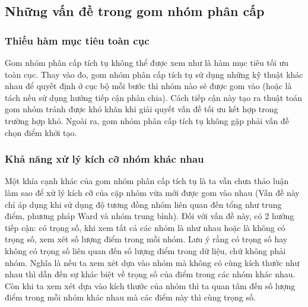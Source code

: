 
\subsection{Những vấn đề trong gom nhóm phân cấp}
\subsubsection{Thiếu hàm mục tiêu toàn cục}
Gom nhóm phân cấp tích tụ không thể được xem như là hàm mục tiêu tối ưu toàn cục.
Thay vào đo, gom nhóm phân cấp tích tụ sử dụng những kỹ thuật khác nhau để quyết định ở cục bộ mỗi bước thì nhóm nào sẽ được gom vào (hoặc là tách nếu sử dụng hướng tiếp cận phân chia).
Cách tiếp cận này tạo ra thuật toán gom nhóm tránh được khó khăn khi giải quyết vấn đề tối ưu kết hợp trong trường hợp khó.
Ngoài ra, gom nhóm phân cấp tích tụ không gặp phải vấn đề chọn điểm khởi tạo.

\subsubsection{Khả năng xử lý kích cỡ nhóm khác nhau}
Một khía cạnh khác của gom nhóm phân cấp tích tụ là ta vẫn chưa thảo luận làm sao để xử lý kích cỡ của cặp nhóm vừa mới được gom vào nhau (Vấn đề này chỉ áp dụng khi sử dụng độ tương đồng nhóm liên quan đến tổng như trung điểm, phương pháp Ward và nhóm trung bình).
Đối với vấn đề này, có 2 hướng tiếp cận: có trọng số, khi xem tất cả các nhóm là như nhau hoặc là không có trọng số, xem xét số lượng điểm trong mỗi nhóm.
Lưu ý rằng có trọng số hay không có trọng số liên quan đến số lượng điểm trong dữ liệu, chứ không phải nhóm.
Nghĩa là nếu ta xem xét dựa vào nhóm mà không có cùng kích thước như nhau thì dẫn đến sự khác biệt về trọng số của điểm trong các nhóm khác nhau.
Còn khi ta xem xét dựa vào kích thước của nhóm thì ta quan tâm đến số lượng điểm trong mỗi nhóm khác nhau mà các điểm này thì cùng trọng số.


